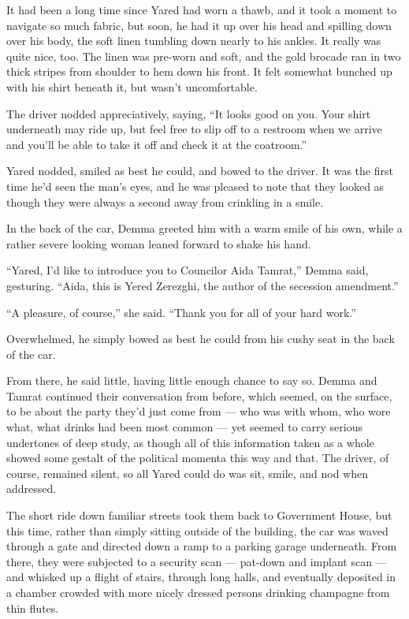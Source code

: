 It had been a long time since Yared had worn a thawb, and it took a moment to navigate so much fabric, but soon, he had it up over his head and spilling down over his body, the soft linen tumbling down nearly to his ankles. It really was quite nice, too. The linen was pre-worn and soft, and the gold brocade ran in two thick stripes from shoulder to hem down his front. It felt somewhat bunched up with his shirt beneath it, but wasn't uncomfortable.

The driver nodded appreciatively, saying, ``It looks good on you. Your shirt underneath may ride up, but feel free to slip off to a restroom when we arrive and you'll be able to take it off and check it at the coatroom.''

Yared nodded, smiled as best he could, and bowed to the driver. It was the first time he'd seen the man's eyes, and he was pleased to note that they looked as though they were always a second away from crinkling in a smile.

In the back of the car, Demma greeted him with a warm smile of his own, while a rather severe looking woman leaned forward to shake his hand.

``Yared, I'd like to introduce you to Councilor Aida Tamrat,'' Demma said, gesturing. ``Aida, this is Yered Zerezghi, the author of the secession amendment.''

``A pleasure, of course,'' she said. ``Thank you for all of your hard work.''

Overwhelmed, he simply bowed as best he could from his cushy seat in the back of the car.

From there, he said little, having little enough chance to say so. Demma and Tamrat continued their conversation from before, which seemed, on the surface, to be about the party they'd just come from — who was with whom, who wore what, what drinks had been most common — yet seemed to carry serious undertones of deep study, as though all of this information taken as a whole showed some gestalt of the political momenta this way and that. The driver, of course, remained silent, so all Yared could do was sit, smile, and nod when addressed.

The short ride down familiar streets took them back to Government House, but this time, rather than simply sitting outside of the building, the car was waved through a gate and directed down a ramp to a parking garage underneath. From there, they were subjected to a security scan — pat-down and implant scan — and whisked up a flight of stairs, through long halls, and eventually deposited in a chamber crowded with more nicely dressed persons drinking champagne from thin flutes.

